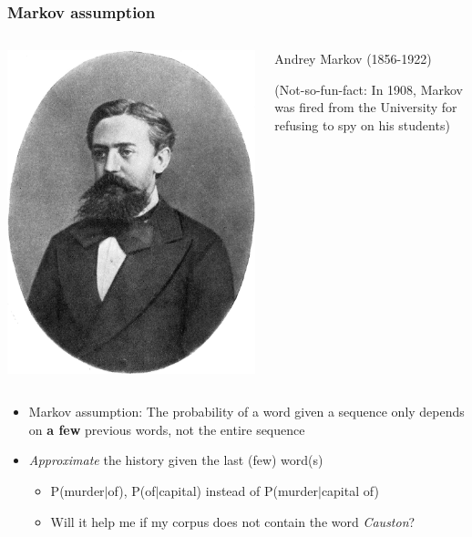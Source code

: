 \documentclass{beamer}
\begin{document}
\begin{frame}
\frametitle{Markov assumption}

\begin{columns}[T] %
\begin{column}{.20\textwidth}
\includegraphics[height=0.2\textheight]{figures/markov.jpg}
\end{column}%
\hfill%
\begin{column}{.75\textwidth}
{\small Andrey Markov (1856-1922)}

{\small (Not-so-fun-fact: In 1908, Markov was fired from the University for refusing to spy on his students)}
\end{column}%
\end{columns}

\vspace{0.5cm}

\begin{itemize}
\item Markov assumption: The probability of a word given a sequence 
only depends on {\bf a few} previous words, not the entire sequence
\item {\it Approximate} the history given the last (few) word(s)
\begin{itemize}
\item P(murder$\vert$of), P(of$\vert$capital) instead of P(murder$\vert$capital of)
    \item Will it help me if my corpus does not contain the word {\it Causton}?
\end{itemize}
\end{itemize}


\end{frame}
\end{document}
